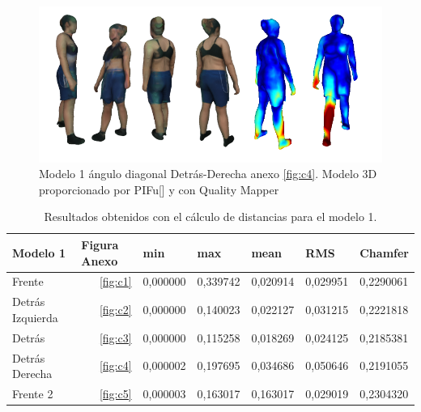 \begin{figure}[H]
	\centering
	\includegraphics[scale=0.4]{imagenes/cameliadetrasderecha.png}
	\caption{Modelo 1 ángulo diagonal Detrás-Derecha anexo \ref{fig:c4}. Modelo 3D proporcionado por PIFu[\cite{pifu}] y  con Quality Mapper}
	\label{fig:camederechadetras}
\end{figure}

\begin{table}[H]
	\centering
	\caption{Resultados obtenidos con el cálculo de distancias para el modelo 1.}
	\label{table:came}
	\begin{tabular}{l|rrrrrl}
		Modelo 1         & \multicolumn{1}{l}{Figura Anexo} & \multicolumn{1}{l}{min} & \multicolumn{1}{l}{max} & \multicolumn{1}{l}{mean} & \multicolumn{1}{l}{RMS} & Chamfer    \\ 
		\hline
		Frente           & \ref{fig:c1}    & 0,000000                & 0,339742                & 0,020914                 & 0,029951                & 0,2290061  \\
		Detrás Izquierda & \ref{fig:c2}    & 0,000000                & 0,140023                & 0,022127                 & 0,031215                & 0,2221818  \\
		Detrás           & \ref{fig:c3}    & 0,000000                & 0,115258                & 0,018269                 & 0,024125                & 0,2185381  \\
		Detrás Derecha   & \ref{fig:c4}    & 0,000002                & 0,197695                & 0,034686                 & 0,050646                & 0,2191055  \\
		Frente 2         & \ref{fig:c5}    & 0,000003                & 0,163017                & 0,163017                 & 0,029019                & 0,2304320 
	\end{tabular}
\end{table}
\FloatBarrier

